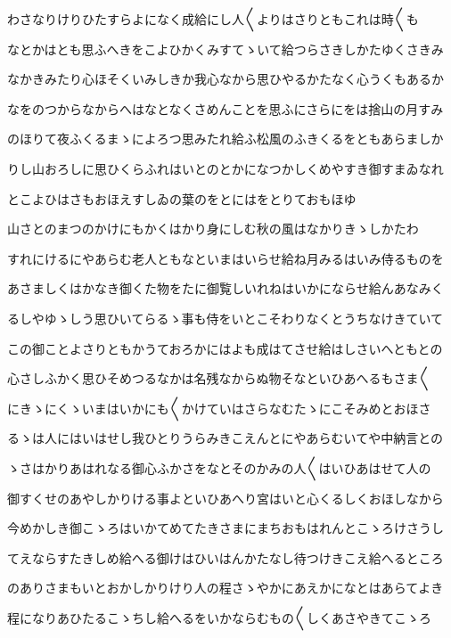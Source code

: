 \documentclass[a4paper,11pt,landscape]{ltjtarticle}
\begin{document}
\par\medskip
わさなりけりひたすらよになく成給にし人〱よりはさりともこれは時〱も
\par\medskip
なとかはとも思ふへきをこよひかくみすてゝいて給つらさきしかたゆくさきみ
\par\medskip
なかきみたり心ほそくいみしきか我心なから思ひやるかたなく心うくもあるか
\par\medskip
なをのつからなからへはなとなくさめんことを思ふにさらにをは捨山の月すみ
\par\medskip
のほりて夜ふくるまゝによろつ思みたれ給ふ松風のふきくるをともあらましか
\par\medskip
りし山おろしに思ひくらふれはいとのとかになつかしくめやすき御すまゐなれ
\par\medskip
とこよひはさもおほえすしゐの葉のをとにはをとりておもほゆ
\par\medskip
山さとのまつのかけにもかくはかり身にしむ秋の風はなかりきゝしかたわ
\par\medskip
すれにけるにやあらむ老人ともなといまはいらせ給ね月みるはいみ侍るものを
\par\medskip
あさましくはかなき御くた物をたに御覧しいれねはいかにならせ給んあなみく
\par\medskip
るしやゆゝしう思ひいてらるゝ事も侍をいとこそわりなくとうちなけきていて
\par\medskip
この御ことよさりともかうておろかにはよも成はてさせ給はしさいへともとの
\par\medskip
心さしふかく思ひそめつるなかは名残なからぬ物そなといひあへるもさま〱
\par\medskip
にきゝにくゝいまはいかにも〱かけていはさらなむたゝにこそみめとおほさ
\par\medskip
るゝは人にはいはせし我ひとりうらみきこえんとにやあらむいてや中納言との
\par\medskip
ゝさはかりあはれなる御心ふかさをなとそのかみの人〱はいひあはせて人の
\par\medskip
御すくせのあやしかりける事よといひあへり宮はいと心くるしくおほしなから
\par\medskip
今めかしき御こゝろはいかてめてたきさまにまちおもはれんとこゝろけさうし
\par\medskip
てえならすたきしめ給へる御けはひいはんかたなし待つけきこえ給へるところ
\par\medskip
のありさまもいとおかしかりけり人の程さゝやかにあえかになとはあらてよき
\par\medskip
程になりあひたるこゝちし給へるをいかならむもの〱しくあさやきてこゝろ
\par\medskip
\end{document}
